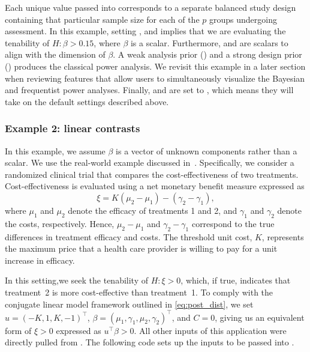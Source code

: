 Each unique value passed into  corresponds to a separate balanced study design
containing that particular sample size for each of the $p$ groups undergoing assessment. In this example, setting ,  and  implies that we are evaluating the tenability of $H: \beta > 0.15$, where $\beta$ is a scalar. Furthermore,  and  are scalars to align 
with the dimension of $\beta$. A weak analysis prior () and a strong design prior () produces the classical power analysis. 
We revisit this example in a later section when
reviewing features that allow users to simultaneously visualize the Bayesian and frequentist power analyses. Finally,  and  are set to , which means they will take on the default settings described above. 

\subsubsection{Example 2: linear contrasts}
\label{subsec:ex2}

In this example, we assume $\beta$ is a vector of unknown components rather than a scalar. We use
the real-world example discussed in~\cite{ohagan}. Specifically, we consider 
a randomized clinical trial  that compares the cost-effectiveness of two treatments.
Cost-effectiveness is evaluated using
a net monetary benefit measure expressed as
\[
\xi = K(\mu_2 - \mu_1) - (\gamma_2 - \gamma_1),
\]
where $\mu_1$ and $\mu_2$ denote the efficacy of treatments 1 and 2, and $\gamma_1$ and $\gamma_2$ denote the costs, respectively. 
Hence, $\mu_2 - \mu_1$ and $\gamma_2 - \gamma_1$
correspond to the true differences in 
treatment efficacy and costs.
The threshold unit cost, $K$, represents the maximum price that a 
health care provider is willing to pay for a 
unit increase in efficacy. 

In this setting,we seek the tenability of $H: \xi > 0$, which, if true, indicates that treatment~2 is more cost-effective than treatment~1. To comply with the conjugate linear model framework outlined in \eqref{eq:post_dist}, we set 
$u = (-K, 1, K, -1)^{\top}$, $\beta = (\mu_1, \gamma_1, \mu_2, \gamma_2)^{\top}$, and $C = 0$, giving us an equivalent form of $\xi > 0$ expressed as  $u^{\top}\beta > 0$. All other inputs of this application were directly pulled from \cite{ohagan}. The following code sets up the inputs to be passed into . 

